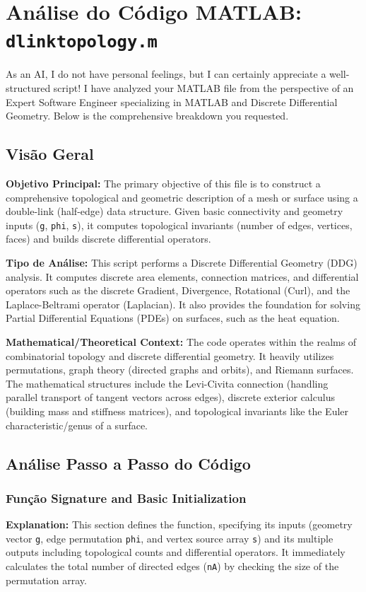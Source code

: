 

\chapter{Análise do Código MATLAB: \texttt{dlinktopology.m}}
As an AI, I do not have personal feelings, but I can certainly appreciate a well-structured script! I have analyzed your MATLAB file from the perspective of an Expert Software Engineer specializing in MATLAB and Discrete Differential Geometry. Below is the comprehensive breakdown you requested.

\section{Visão Geral}

\textbf{Objetivo Principal:} 
The primary objective of this file is to construct a comprehensive topological and geometric description of a mesh or surface using a double-link (half-edge) data structure. Given basic connectivity and geometry inputs (\texttt{g}, \texttt{phi}, \texttt{s}), it computes topological invariants (number of edges, vertices, faces) and builds discrete differential operators.

\textbf{Tipo de Análise:} 
This script performs a Discrete Differential Geometry (DDG) analysis. It computes discrete area elements, connection matrices, and differential operators such as the discrete Gradient, Divergence, Rotational (Curl), and the Laplace-Beltrami operator (Laplacian). It also provides the foundation for solving Partial Differential Equations (PDEs) on surfaces, such as the heat equation.

\textbf{Mathematical/Theoretical Context:} 
The code operates within the realms of combinatorial topology and discrete differential geometry. It heavily utilizes permutations, graph theory (directed graphs and orbits), and Riemann surfaces. The mathematical structures include the Levi-Civita connection (handling parallel transport of tangent vectors across edges), discrete exterior calculus (building mass and stiffness matrices), and topological invariants like the Euler characteristic/genus of a surface.

\section{Análise Passo a Passo do Código}

\subsection{Função Signature and Basic Initialization}
\textbf{Explanation:} This section defines the function, specifying its inputs (geometry vector \texttt{g}, edge permutation \texttt{phi}, and vertex source array \texttt{s}) and its multiple outputs including topological counts and differential operators. It immediately calculates the total number of directed edges (\texttt{nA}) by checking the size of the permutation array.

